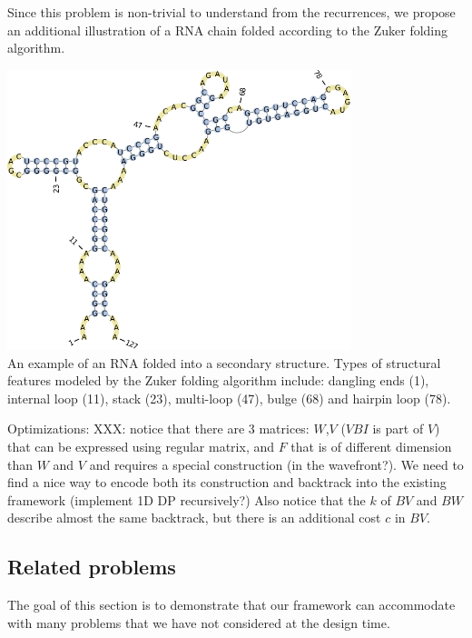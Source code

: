 Since this problem is non-trivial to understand from the recurrences, we propose an additional illustration of a RNA chain folded according to the Zuker folding algorithm.
\begin{center}
\includegraphics[width=10cm]{inc/zuker_struct.pdf} \\
\small An example of an RNA folded into a secondary structure. Types of structural features modeled by the Zuker folding algorithm include: dangling ends (1), internal loop (11), stack (23), multi-loop (47), bulge (68) and hairpin loop (78).
\end{center}

\item Optimizations: {\color{red} XXX: notice that there are 3 matrices: $W$,$V$ ($VBI$ is part of $V$) that can be expressed using regular matrix, and $F$ that is of different dimension than $W$ and $V$ and requires a special construction (in the wavefront?). We need to find a nice way to encode both its construction and backtrack into the existing framework (implement 1D DP recursively?) Also notice that the $k$ of $BV$ and $BW$ describe almost the same backtrack, but there is an additional cost $c$ in $BV$.}
\ole

\newpage
\subsection{Related problems}
The goal of this section is to demonstrate that our framework can accommodate with many problems that we have not considered at the design time.

